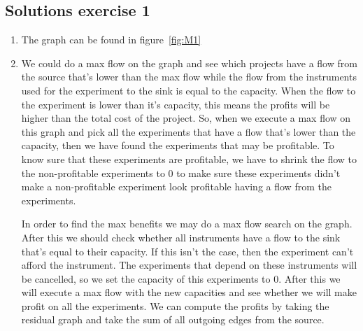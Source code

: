 \documentclass{article}
\begin{document}
\subsection*{Solutions exercise 1}
\begin{enumerate}
  \item The graph can be found in figure~\ref{fig:M1}
  \item We could do a max flow on the graph and see which projects have a flow from the source that's lower than the max flow while the flow from the instruments used for the experiment to the sink is equal to the capacity. When the flow to the experiment is lower than it's capacity, this means the profits will be higher than the total cost of the project. So, when we execute a max flow on this graph and pick all the experiments that have a flow that's lower than the capacity, then we have found the experiments that may be profitable. To know sure that these experiments are profitable, we have to shrink the flow to the non-profitable experiments to 0 to make sure these experiments didn't make a non-profitable experiment look profitable having a flow from the experiments.

  In order to find the max benefits we may do a max flow search on the graph. After this we should check whether all instruments have a flow to the sink that's equal to their capacity. If this isn't the case, then the experiment can't afford the instrument. The experiments that depend on these instruments will be cancelled, so we set the capacity of this experiments to 0. After this we will execute a max flow with the new capacities and see whether we will make profit on all the experiments. We can compute the profits by taking the residual graph and take the sum of all outgoing edges from the source.
\end{enumerate}
\end{document}
